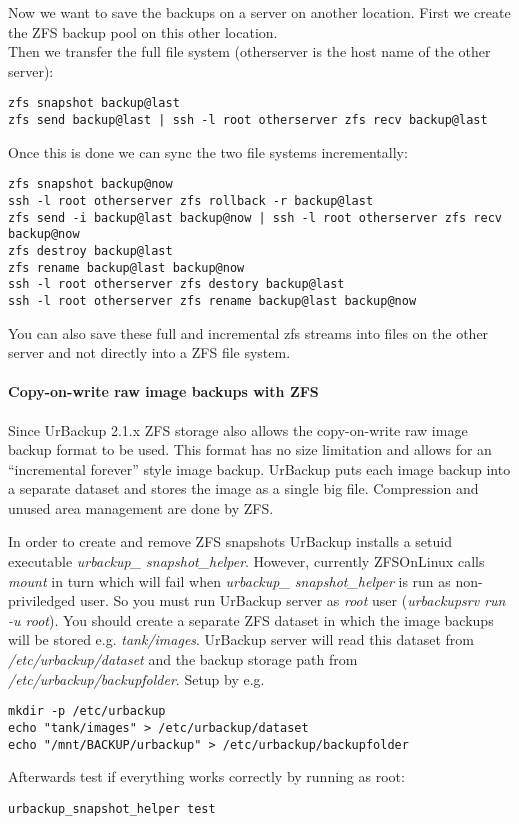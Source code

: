 \documentclass[a4paper,10pt]{article}
\begin{document}
Now we want to save the backups on a server on another location. First we create the ZFS backup pool on this other location.\\
Then we transfer the full file system (otherserver is the host name of the other server):
\begin{verbatim}
zfs snapshot backup@last
zfs send backup@last | ssh -l root otherserver zfs recv backup@last
\end{verbatim}
Once this is done we can sync the two file systems incrementally:
\begin{verbatim}
zfs snapshot backup@now
ssh -l root otherserver zfs rollback -r backup@last
zfs send -i backup@last backup@now | ssh -l root otherserver zfs recv backup@now
zfs destroy backup@last
zfs rename backup@last backup@now
ssh -l root otherserver zfs destory backup@last
ssh -l root otherserver zfs rename backup@last backup@now
\end{verbatim}
You can also save these full and incremental zfs streams into files on the other server and not directly into a ZFS file system.

\paragraph{Copy-on-write raw image backups with ZFS}
Since UrBackup 2.1.x ZFS storage also allows the copy-on-write raw image backup format to be used.
This format has no size limitation and allows for an ``incremental forever'' style image backup.
UrBackup puts each image backup into a separate dataset and stores the image
as a single big file. Compression and unused area management are done by ZFS.

\noindent In order to create and remove ZFS snapshots UrBackup installs a setuid
executable \textsl{urbackup\_ snapshot\_helper}. However, currently ZFSOnLinux calls
\textsl{mount} in turn which will fail when \textsl{urbackup\_ snapshot\_helper} is run
as non-priviledged user. So you must run UrBackup server as \textsl{root} user
(\textsl{urbackupsrv run -u root}). You should create a separate ZFS dataset in which
the image backups will be stored e.g. \textsl{tank/images}. UrBackup server will read
this dataset from \textsl{/etc/urbackup/dataset} and the backup storage path from \textsl{/etc/urbackup/backupfolder}. Setup by e.g.
\begin{verbatim}
mkdir -p /etc/urbackup
echo "tank/images" > /etc/urbackup/dataset
echo "/mnt/BACKUP/urbackup" > /etc/urbackup/backupfolder
\end{verbatim}
Afterwards test if everything works correctly by running as root:
\begin{verbatim}
urbackup_snapshot_helper test
\end{verbatim}
\end{document}
